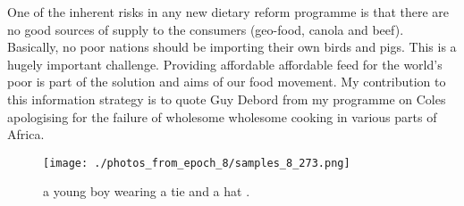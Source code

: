 \documentclass{article}%
\begin{document}
One of the inherent risks in any new dietary reform programme is that there are no good sources of supply to the consumers (geo{-}food, canola and beef).\newline%
Basically, no poor nations should be importing their own birds and pigs. This is a hugely important challenge.\newline%
Providing affordable affordable feed for the world's poor is part of the solution and aims of our food movement. My contribution to this information strategy is to quote Guy Debord from my programme on Coles apologising for the failure of wholesome wholesome cooking in various parts of Africa.\newline%

%


\begin{figure}[h!]%
\centering%
\texttt{[image: ./photos\_from\_epoch\_8/samples\_8\_273.png]}%
\caption{a young boy wearing a tie and a hat .}%
\end{figure}

%
\end{document}
